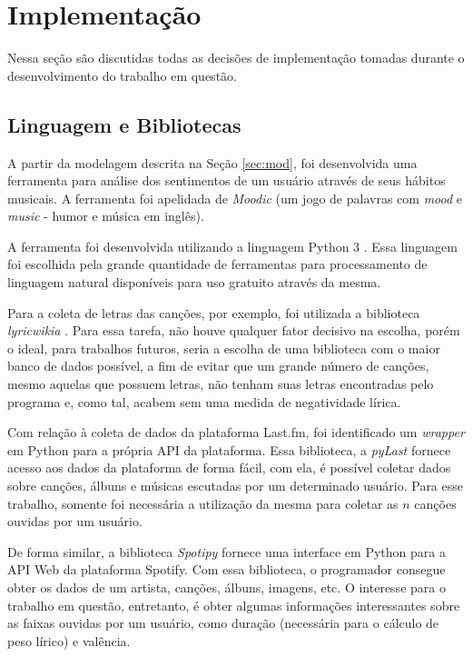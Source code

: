 \section{Implementação}

Nessa seção são discutidas todas as decisões de implementação tomadas
durante o desenvolvimento do trabalho em questão.

\subsection{Linguagem e Bibliotecas}

A partir da modelagem descrita na Seção \ref{sec:mod}, foi desenvolvida
uma ferramenta para análise dos sentimentos de um usuário através de seus
hábitos musicais. A ferramenta foi apelidada de \textit{Moodic} (um jogo
de palavras com \textit{mood} e \textit{music} - humor e música em inglês).

A ferramenta foi desenvolvida utilizando a linguagem Python 3 \cite{python3}.
Essa linguagem foi escolhida pela grande quantidade de ferramentas para
processamento de linguagem natural disponíveis para uso gratuito através da
mesma.

Para a coleta de letras das canções, por exemplo, foi utilizada a biblioteca
\textit{lyricwikia} \cite{lyricwikia}. Para essa tarefa, não houve qualquer
fator decisivo na escolha, porém o ideal, para trabalhos futuros, seria
a escolha de uma biblioteca com o maior banco de dados possível, a fim
de evitar que um grande número de canções, mesmo aquelas que possuem letras,
não tenham suas letras encontradas pelo programa e, como tal, acabem sem
uma medida de negatividade lírica.

Com relação à coleta de dados da plataforma Last.fm, foi identificado um
\textit{wrapper} em Python para a própria API da plataforma. Essa biblioteca,
a \textit{pyLast} \cite{pylast} fornece acesso aos dados da plataforma de
forma fácil, com ela, é possível coletar dados sobre canções, álbuns e
músicas escutadas por um determinado usuário. Para esse trabalho, somente
foi necessária a utilização da mesma para coletar as $ n $ canções ouvidas
por um usuário.

De forma similar, a biblioteca \textit{Spotipy} \cite{spotipy} fornece uma
interface em Python para a API Web da plataforma Spotify. Com essa biblioteca,
o programador consegue obter os dados de um artista, canções, álbuns, imagens,
etc. O interesse para o trabalho em questão, entretanto, é obter algumas
informações interessantes sobre as faixas ouvidas por um usuário, como
duração (necessária para o cálculo de peso lírico) e valência.

